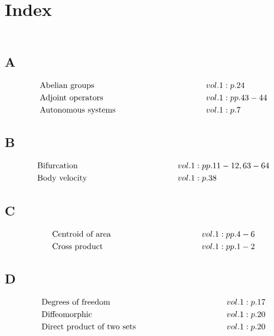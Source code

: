 \documentclass[a4paper]{article}
\begin{document}
 
\section*{Index} 
\allowdisplaybreaks 
\begin{align*} 
\end{align*} 
\subsection*{A} 
\begin{align*} 
&\text{Abelian groups} \hspace*{10em}&& vol. 1: p. 24\\
&\text{Adjoint operators} \hspace*{10em}&& vol. 1: pp. 43-44\\
&\text{Autonomous systems} \hspace*{10em}&& vol. 1: p. 7\\
\end{align*} 
\subsection*{B} 
\begin{align*} 
&\text{Bifurcation} \hspace*{10em}&& vol. 1: pp. 11-12, 63-64\\
&\text{Body velocity} \hspace*{10em}&& vol. 1: p. 38\\
\end{align*} 
\subsection*{C} 
\begin{align*} 
&\text{Centroid of area} \hspace*{10em}&& vol. 1: pp. 4-6\\
&\text{Cross product} \hspace*{10em}&& vol. 1: pp. 1-2\\
\end{align*} 
\subsection*{D} 
\begin{align*} 
&\text{Degrees of freedom} \hspace*{10em}&& vol. 1: p. 17\\
&\text{Diffeomorphic} \hspace*{10em}&& vol. 1: p. 20\\
&\text{Direct product of two sets} \hspace*{10em}&& vol. 1: p. 20\\
\end{align*} 
\end{document}

